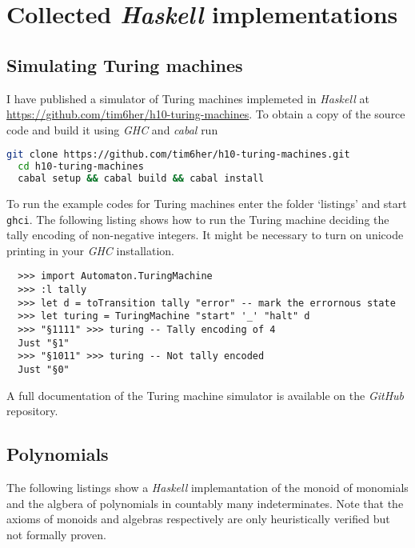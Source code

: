 \section{Collected \emph{Haskell} implementations}

\subsection{Simulating Turing machines}%
\label{app:turing}%

I have published a simulator of Turing machines implemeted in \emph{Haskell}
at \url{https://github.com/tim6her/h10-turing-machines}. To obtain a copy of
the source code and build it using \emph{GHC} and \emph{cabal} run

\begin{lstlisting}[language=bash]
  git clone https://github.com/tim6her/h10-turing-machines.git
  cd h10-turing-machines
  cabal setup && cabal build && cabal install
\end{lstlisting}

To run the example codes for Turing machines enter the folder ‘listings’ and
start \verb+ghci+. The following listing shows how to run the Turing machine
deciding the tally encoding of non-negative integers. It might be necessary to
turn on unicode printing in your \emph{GHC} installation.

\begin{lstlisting}
  >>> import Automaton.TuringMachine
  >>> :l tally
  >>> let d = toTransition tally "error" -- mark the errornous state
  >>> let turing = TuringMachine "start" '_' "halt" d
  >>> "§1111" >>> turing -- Tally encoding of 4
  Just "§1"
  >>> "§1011" >>> turing -- Not tally encoded
  Just "§0"
\end{lstlisting}

A full documentation of the Turing machine simulator is available on the
\emph{GitHub} repository.

\subsection{Polynomials} \label{app:polynomials}

The following listings show a \emph{Haskell} implemantation of the monoid of
monomials and the algbera of polynomials in countably many indeterminates. Note
that the axioms of monoids and algebras respectively are only heuristically
verified but not formally proven.




